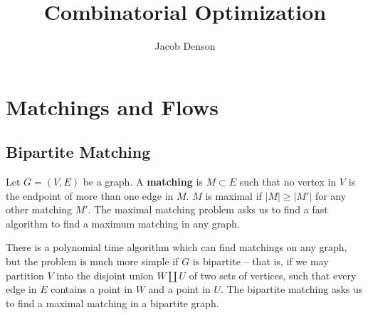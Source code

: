 

\usepackage{amsmath}
\usepackage{algorithm}
\usepackage[noend]{algpseudocode}

\DeclareMathOperator{\Dom}{Dom}
\DeclareMathOperator{\delin}{\delta_{\text{in}}}
\DeclareMathOperator{\delout}{\delta_{\text{out}}}

\def\@fnsymbol#1{\ensuremath{\ifcase#1\or *\or \dagger\or \ddagger\or
   \mathsection\or \mathparagraph\or \|\or **\or \dagger\dagger
   \or \ddagger\ddagger \else\@ctrerr\fi}}
\renewcommand{\thefootnote}{\fnsymbol{footnote}}

\title{Combinatorial Optimization}
\author{Jacob Denson}




\maketitle

\tableofcontents


\chapter{Matchings and Flows}

\section{Bipartite Matching}

Let $G = (V,E)$ be a graph. A {\bf matching} is $M \subset E$ such that no vertex in $V$ is the endpoint of more than one edge in $M$. $M$ is maximal if $|M| \geq |M'|$ for any other matching $M'$. The maximal matching problem asks us to find a fast algorithm to find a maximum matching in any graph.

There is a polynomial time algorithm which can find matchings on any graph, but the problem is much more simple if $G$ is bipartite -- that is, if we may partition $V$ into the disjoint union $W \amalg U$ of two sets of vertices, such that every edge in $E$ contains a point in $W$ and a point in $U$. The bipartite matching asks us to find a maximal matching in a bipartite graph.

